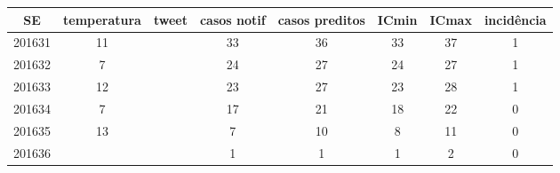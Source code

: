 \begin{tabular}{c|ccccccc}
  \hline
SE & temperatura & tweet & casos notif & casos preditos & ICmin & ICmax & incidência \\ 
  \hline
201631 & 11 &  & 33 & 36 & 33 & 37 & 1 \\ 
  201632 & 7 &  & 24 & 27 & 24 & 27 & 1 \\ 
  201633 & 12 &  & 23 & 27 & 23 & 28 & 1 \\ 
  201634 & 7 &  & 17 & 21 & 18 & 22 & 0 \\ 
  201635 & 13 &  & 7 & 10 & 8 & 11 & 0 \\ 
  201636 &  &  & 1 & 1 & 1 & 2 & 0 \\ 
   \hline
\end{tabular}
